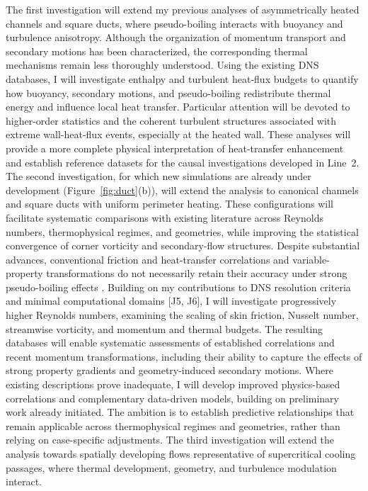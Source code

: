 \documentclass[11pt]{article}
\begin{document}
The first investigation will extend my previous analyses of asymmetrically heated channels and square ducts, where pseudo-boiling interacts with buoyancy and turbulence anisotropy.
Although the organization of momentum transport and secondary motions has been characterized, the corresponding thermal mechanisms remain less thoroughly understood.
Using the existing DNS databases, I will investigate enthalpy and turbulent heat-flux budgets to quantify how buoyancy, secondary motions, and pseudo-boiling redistribute thermal energy and influence local heat transfer.
Particular attention will be devoted to higher-order statistics and the coherent turbulent structures associated with extreme wall-heat-flux events, especially at the heated wall.
These analyses will provide a more complete physical interpretation of heat-transfer enhancement and establish reference datasets for the causal investigations developed in Line~2.
The second investigation, for which new simulations are already under development (Figure~\ref{fig:duct}(b)), will extend the analysis to canonical channels and square ducts with uniform perimeter heating.
These configurations will facilitate systematic comparisons with existing literature across Reynolds numbers, thermophysical regimes, and geometries, while improving the statistical convergence of corner vorticity and secondary-flow structures.
Despite substantial advances, conventional friction and heat-transfer correlations and variable-property transformations do not necessarily retain their accuracy under strong pseudo-boiling effects \cite{Modesti2026,Li2025}.
Building on my contributions to DNS resolution criteria and minimal computational domains [J5, J6], I will investigate progressively higher Reynolds numbers, examining the scaling of skin friction, Nusselt number, streamwise vorticity, and momentum and thermal budgets.
The resulting databases will enable systematic assessments of established correlations and recent momentum transformations, including their ability to capture the effects of strong property gradients and geometry-induced secondary motions.
Where existing descriptions prove inadequate, I will develop improved physics-based correlations and complementary data-driven models, building on preliminary work already initiated.
The ambition is to establish predictive relationships that remain applicable across thermophysical regimes and geometries, rather than relying on case-specific adjustments.
The third investigation will extend the analysis towards spatially developing flows representative of supercritical cooling passages, where thermal development, geometry, and turbulence modulation interact.
\end{document}
